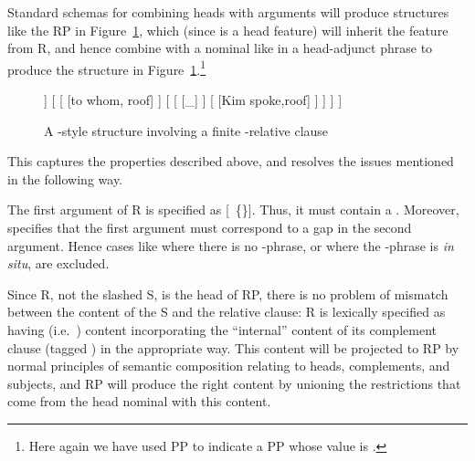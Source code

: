 \documentclass[output=paper
 	        ,biblatex
                ,babelshorthands
                ,newtxmath
                ,draftmode
                ,colorlinks, citecolor=brown
]{langscibook}
\begin{document}
Standard schemas for combining heads with arguments will produce structures like the RP in
Figure~\ref{fig:rc-3}, which (since  is a head feature) will inherit the
 feature from R, and hence combine with a nominal like  in a
head-adjunct phrase to produce the structure in Figure~\ref{fig:rc-3}.\footnote{Here again
  we have used PP  to indicate a PP whose  value is .}
\begin{figure}
  \begin{forest} %
   [\ibar{N}$_\ibox{1}$%
      [\ibox{7} \ibar{N}$_\ibox{1}$
      	[person]  
      ]  
      [ 
         [
            [to whom, roof] 
         ]
         [
            [%
            	[\_]
            ]
            [
            	[Kim spoke,roof]
            ]
         ]
      ]
   ]
   \end{forest}
   \caption{A \cite{Pollard:Sag:94}-style structure involving a finite -relative clause}
   \label{fig:rc-3}
\end{figure}

This captures the properties described above, and resolves the issues mentioned in the
following way.

The first argument of R is specified as [~\{\}]. Thus, it must contain
a . Moreover,  specifies that the first argument must
correspond to a gap in the second argument. Hence cases like  where there is no
-phrase, or where the -phrase is \emph{in situ}, are excluded.

Since R, not the slashed S, is the head of RP, there is no problem of mismatch between the
content of the S and the relative clause: R is lexically specified as having 
(i.e.\ ) content incorporating the ``internal'' content of its complement clause
(tagged ) in the appropriate way. This  content will be
projected to RP by normal principles of semantic composition relating to heads,
complements, and subjects, and RP will produce the right content by unioning the
restrictions that come from the head nominal with this  content.
\end{document}
